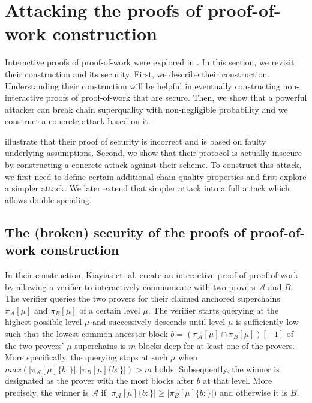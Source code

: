 \section{Attacking the proofs of proof-of-work construction}

Interactive proofs of proof-of-work were explored in \cite{KLS}. In this
section, we revisit their construction and its security. First, we describe their construction. Understanding their construction will be helpful in eventually
constructing non-interactive proofs of proof-of-work that are secure. Then, we
show that a powerful attacker can break chain superquality with non-negligible
probability and we construct a concrete attack based on it.

illustrate
that their proof of security is incorrect and is based on faulty underlying
assumptions. Second, we show that their protocol is actually insecure by
constructing a concrete attack against their scheme. To construct this attack,
we first need to define certain additional chain quality properties and first
explore a simpler attack. We later extend that simpler attack into a full attack
which allows double spending.

\subsection{The (broken) security of the proofs of proof-of-work construction}

In their construction, Kiayias et. al. \cite{KLS} create an interactive proof of
proof-of-work by allowing a verifier to interactively communicate with two
provers $\mathcal{A}$ and $B$. The verifier queries the two provers for their
claimed anchored superchains $\pi_\mathcal{A}[\mu]$ and $\pi_B[\mu]$ of a
certain level $\mu$. The verifier starts querying at the highest possible level
$\mu$ and successively descends until level $\mu$ is sufficiently low such that
the lowest common ancestor block $b = (\pi_\mathcal{A}[\mu] \cap
\pi_B[\mu])[-1]$ of the two provers' $\mu$-superchains is $m$ blocks deep for at
least one of the provers. More specifically, the querying stops at such $\mu$
when $max(|\pi_\mathcal{A}[\mu]\{b:\}|, |\pi_B[\mu]\{b:\}|) > m$ holds.
Subsequently, the winner is designated as the prover with the most blocks after
$b$ at that level. More precisely, the winner is $\mathcal{A}$ if
$|\pi_\mathcal{A}[\mu]\{b:\}| \geq |\pi_B[\mu]\{b:\}|)$ and otherwise it is $B$.

